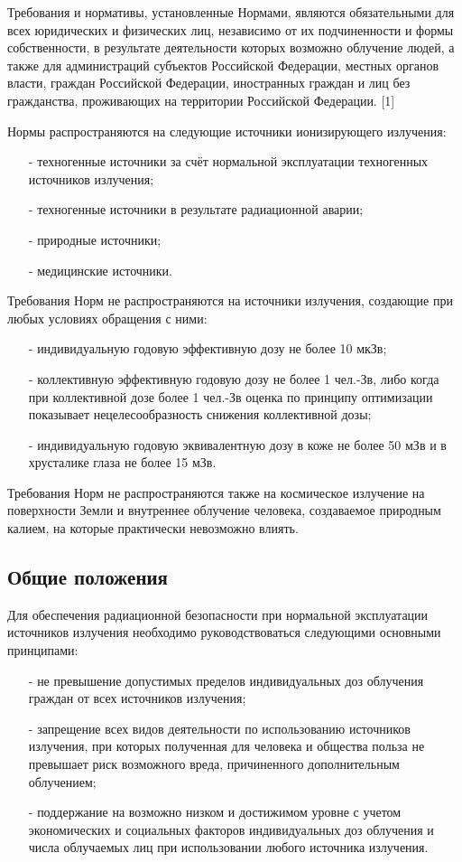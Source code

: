 	Требования и нормативы, установленные Нормами, являются обязательными 
	для всех юридических и физических лиц, независимо от их подчиненности и 
	формы собственности, в результате деятельности которых возможно облучение 
	людей, а также для администраций субъектов Российской Федерации, местных 
	органов власти, граждан Российской Федерации, иностранных граждан и лиц без 
	гражданства, проживающих на территории Российской Федерации. [1]

	Нормы распространяются на следующие  источники ионизирующего излучения:
	\begin{itemize}
		\item[-] техногенные источники за счёт нормальной эксплуатации 
			техногенных источников излучения;
		\item[-] техногенные источники в результате радиационной аварии;
		\item[-] природные  источники;
		\item[-] медицинские источники.
	\end{itemize}

	Требования Норм не распространяются на источники излучения, создающие при 
	любых условиях обращения с ними: 
	\begin{itemize}
		\item[-] индивидуальную годовую эффективную дозу не более 10 мкЗв;
		\item[-] коллективную эффективную годовую дозу не более 1 чел.-Зв, 
			либо когда при коллективной дозе более 1 чел.-Зв оценка по принципу 
			оптимизации показывает нецелесообразность снижения коллективной дозы;
		\item[-] индивидуальную годовую эквивалентную дозу в коже не более 50 
			мЗв и в хрусталике глаза не более 15 мЗв.
	\end{itemize}
	
	Требования Норм не распространяются также на космическое излучение на 
	поверхности Земли и внутреннее облучение человека, создаваемое природным 
	калием, на которые практически невозможно влиять.

\subsection{Общие положения} \label{subsect1_2_2}
	Для  обеспечения радиационной безопасности при нормальной эксплуатации 
	источников излучения необходимо руководствоваться следующими основными 
	принципами:
	\begin{itemize}
		\item[-] не превышение допустимых пределов индивидуальных доз облучения 
			граждан от всех источников  излучения;
		\item[-] запрещение всех видов деятельности по использованию 
			источников излучения, при которых полученная для человека и 
			общества польза не превышает риск возможного вреда, 
			причиненного дополнительным облучением;
		\item[-] поддержание на возможно низком и достижимом уровне с учетом 
			экономических и социальных факторов индивидуальных доз облучения и 
			числа облучаемых лиц при использовании любого источника излучения.
	\end{itemize}


